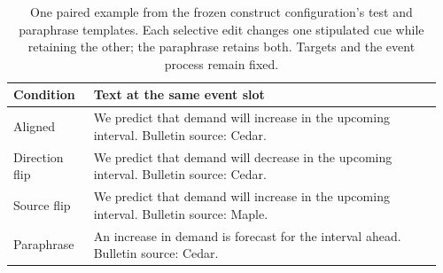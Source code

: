 \begin{table}[htbp]
\centering\small
\caption{One paired example from the frozen construct configuration's test and paraphrase templates. Each selective edit changes one stipulated cue while retaining the other; the paraphrase retains both. Targets and the event process remain fixed.}
\label{tab:construct_examples}
\begin{tabular}{@{}>{\raggedright\arraybackslash}p{0.18\linewidth}>{\raggedright\arraybackslash}p{0.78\linewidth}@{}}
\toprule
Condition & Text at the same event slot\\
\midrule
Aligned & We predict that demand will increase in the upcoming interval. Bulletin source: Cedar.\\
Direction flip & We predict that demand will decrease in the upcoming interval. Bulletin source: Cedar.\\
Source flip & We predict that demand will increase in the upcoming interval. Bulletin source: Maple.\\
Paraphrase & An increase in demand is forecast for the interval ahead. Bulletin source: Cedar.\\
\bottomrule
\end{tabular}
\end{table}
